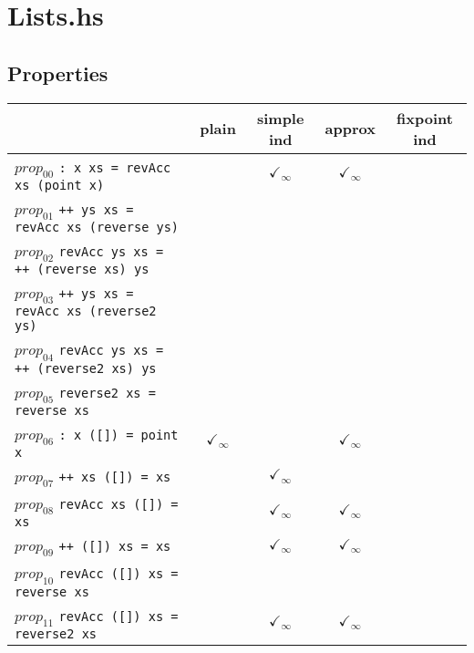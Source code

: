 \documentclass{article}
\begin{document}
\section*{Lists.hs}
\subsection*{Properties}
\begin{longtable}{p{10cm} || c | c | c | c | }
  & plain & simple ind & approx & fixpoint ind \\
\hline
$prop_{00}$ \newline \verb`: x xs = revAcc xs (point x)` &  & $\checkmark_{\infty}$ & $\checkmark_{\infty}$ &  \\
\hline
$prop_{01}$ \newline \verb`++ ys xs = revAcc xs (reverse ys)` &  &  &  &  \\
\hline
$prop_{02}$ \newline \verb`revAcc ys xs = ++ (reverse xs) ys` &  &  &  &  \\
\hline
$prop_{03}$ \newline \verb`++ ys xs = revAcc xs (reverse2 ys)` &  &  &  &  \\
\hline
$prop_{04}$ \newline \verb`revAcc ys xs = ++ (reverse2 xs) ys` &  &  &  &  \\
\hline
$prop_{05}$ \newline \verb`reverse2 xs = reverse xs` &  &  &  &  \\
\hline
$prop_{06}$ \newline \verb`: x ([]) = point x` & $\checkmark_{\infty}$ &  & $\checkmark_{\infty}$ &  \\
\hline
$prop_{07}$ \newline \verb`++ xs ([]) = xs` &  & $\checkmark_{\infty}$ &  &  \\
\hline
$prop_{08}$ \newline \verb`revAcc xs ([]) = xs` &  & $\checkmark_{\infty}$ & $\checkmark_{\infty}$ &  \\
\hline
$prop_{09}$ \newline \verb`++ ([]) xs = xs` &  & $\checkmark_{\infty}$ & $\checkmark_{\infty}$ &  \\
\hline
$prop_{10}$ \newline \verb`revAcc ([]) xs = reverse xs` &  &  &  &  \\
\hline
$prop_{11}$ \newline \verb`revAcc ([]) xs = reverse2 xs` &  & $\checkmark_{\infty}$ & $\checkmark_{\infty}$ &  \\

\end{longtable}
\end{document}
